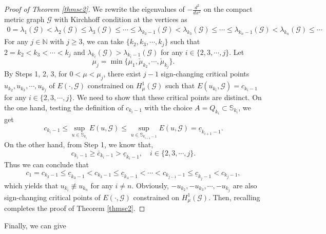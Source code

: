 \documentclass[10pt,a4paper]{article}
\theoremstyle{definition} \theoremstyle{remark}
\numberwithin{equation}{section}
\newcommand{\G}{\mathcal{G}}
\newcommand{\N}{\mathbb{N}}
\newcommand{\s}{\mathbb{S}}
\newcommand{\la}{\lambda}
\begin{document}
\begin{proof}[Proof of Theorem \ref{thmsc2}]
	We rewrite the eigenvalues of $-\frac{d^2}{dx^2}$ on the compact metric graph $\G$ with Kirchhoff condition at the vertices as
	\begin{align*}
		0=\la_1(\G) < \la_2(\G) \leq \la_3(\G) \leq \cdots \leq \la_{k_3-1}(\G) < \la_{k_3}(\G) \leq \cdots \leq \la_{k_n-1}(\G) < \la_{k_n}(\G) \leq \cdots
	\end{align*}
	For any $j \in \N$ with $j \geq 3$, we can take $\{k_2, k_3,\cdots,k_j\}$ such that $2 = k_2 < k_3 < \cdots < k_j$ and $\la_{k_i}(\G) > \la_{k_i-1}(\G)$ for any $i \in \{2,3,\cdots,j\}$. Let 
	$$
	\mu_j = \min\bigl\{\mu_1, \check{\mu}_{k_2},\cdots,\check{\mu}_{k_j}\bigr\}.
	$$
	By Steps 1, 2, 3, for $0 < \mu < \mu_j$, there exist $j-1$ sign-changing critical points $u_{k_2}, u_{k_3},\cdots, u_{k_j}$ of $E(\cdot,\G)$ constrained on $H^1_\mu(\G)$ such that $E(u_{k_i},\G) = c_{k_i-1}$ for any $i \in \{2,3,\cdots,j\}$.  We need to show that these critical points are distinct. On the one hand, testing the definition of $c_{k_i-1}$ with the choice $A = Q_{k_i} \subset \s_{k_i}$, we get
	$$
	c_{k_i-1} \leq \sup_{u \in \s_{k_i}}E(u,\G) \leq \sup_{u \in \s_{k_{i+1}-1}}E(u,\G) = \underline{c}_{k_{i+1}-1}.
	$$
	On the other hand, from Step 1, we know that,
	$$
	c_{k_i-1} \geq \bar{c}_{k_i-1} > \underline{c}_{k_i-1}, \quad i \in \{2,3,\cdots,j\}.
	$$
	Thus we can conclude that
		$$
		c_1 = c_{k_2-1} \leq \underline{c}_{k_3-1} < c_{k_3-1} \leq \underline{c}_{k_4-1} < \cdots < c_{k_{j-1}-1} \leq \underline{c}_{k_j-1} < c_{k_j-1},
		$$	
	which yields that $u_{k_i} \not\equiv u_{k_n}$ for any $i \neq n$. Obviously, $-u_{k_2}, -u_{k_3},\cdots, -u_{k_j}$ are also sign-changing critical points of $E(\cdot,\G)$ constrained on $H^1_\mu(\G)$. Then, recalling \cite[Theorem 1.1]{CJS} completes the proof of Theorem \ref{thmsc2}.
\end{proof}


Finally, we can give
\end{document}
